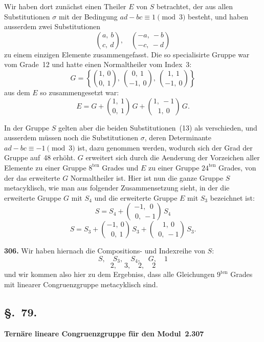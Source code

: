 \documentclass[12pt,a4paper]{article}
\begin{document}
Wir haben dort zun\"achst einen Theiler $E$ von $S$ betrachtet, der aus allen Substitutionen $\sigma$ mit der Bedingung $ad-bc \equiv 1 \pmod 3$ besteht, und haben ausserdem zwei Substitutionen
\begin{equation}
\tag{13}
\binom{a,\ b}{c,\ d},\quad \binom{-a,\ -b}{-c,\ -d}
\end{equation}
zu einem einzigen Elemente zusammengefasst. Die so specialisirte Gruppe war vom Grade~12 und hatte einen Normaltheiler vom Index~3:
\[
G = \left\{\binom{1,\ 0}{0,\ 1},\ \binom{0,\ 1}{-1,\ 0},\ \binom{1,\ 1}{-1,\ 0}\right\}
\]
aus dem $E$ so zusammengesetzt war:
\[
E = G + \binom{1,\ 1}{0,\ 1}\,G + \binom{1,\ -1}{1,\ 0}\,G.
\]

In der Gruppe $S$ gelten aber die beiden Substitutionen~(13) als verschieden, und ausserdem m\"ussen noch die Substitutionen $\sigma$, deren Determinante $ad-bc \equiv -1 \pmod 3$ ist, dazu genommen werden, wodurch sich der Grad der Gruppe auf~48 erh\"oht. $G$ erweitert sich durch die Aenderung der Vorzeichen aller Elemente zu einer Gruppe $8^{\text{ten}}$ Grades und $E$ zu einer Gruppe $24^{\text{ten}}$ Grades, von der das erweiterte $G$ Normaltheiler ist. Hier ist nun die ganze Gruppe $S$ metacyklisch, wie man aus folgender Zusammensetzung sieht, in der die erweiterte Gruppe $G$ mit $S_4$ und die erweiterte Gruppe $E$ mit $S_3$ bezeichnet ist:
\[
S = S_4 + \binom{-1,\ \ 0}{\ \ 0,\ -1}\,S_4
\]
\[
S = S_3 + \binom{-1,\ 0}{\ \ 0,\ 1}\,S_3 + \binom{\ \ 1,\ 0}{\ \ 0,\ -1}\,S_3.
\]

\bigskip
\noindent\textbf{306.} Wir haben hiernach die Compositions- und Indexreihe von $S$:
\[
S,\quad S_3,\quad S_4,\quad G,\quad 1
\]
\[
2,\quad 3,\quad 2,\quad 2
\]
und wir kommen also hier zu dem Ergebniss, dass alle Gleichungen $9^{\text{ten}}$ Grades mit linearer Congruenzgruppe metacyklisch sind.

\subsection*{\S.~79.}
\textbf{Tern\"are lineare Congruenzgruppe f\"ur den Modul~2.}\hfill\textbf{307}\\[4pt]
\end{document}
